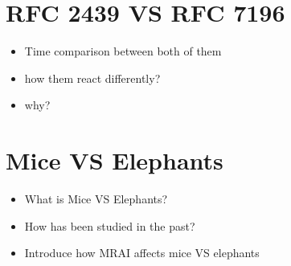 \section{RFC 2439 VS RFC 7196}
\label{sec:bgp_rfd_comparison}

\begin{itemize}
    \item Time comparison between both of them
    \item how them react differently?
    \item why?
\end{itemize}

\section{Mice VS Elephants}
\label{sec:bgp_rfd_mice_vs_elephants}

\begin{itemize}
    \item What is Mice VS Elephants?
    \item How has been studied in the past?
    \item Introduce how MRAI affects mice VS elephants
\end{itemize}
